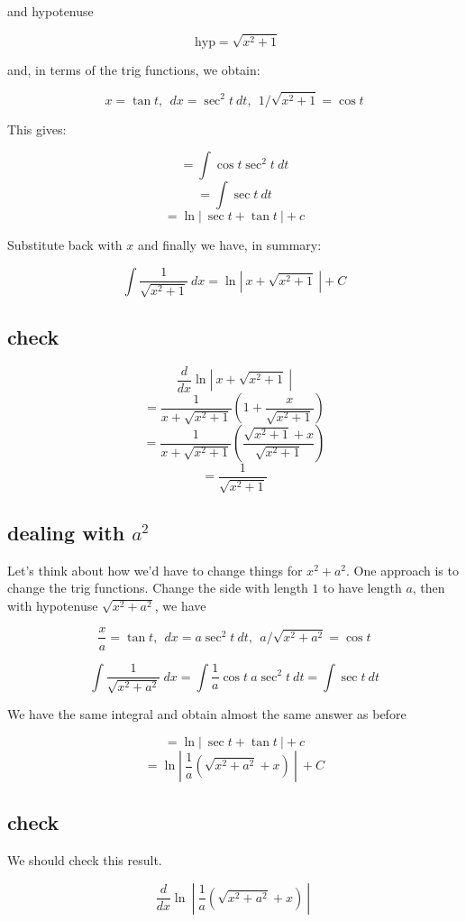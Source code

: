 \documentclass[11pt, oneside]{article}
\begin{document}
and hypotenuse

\[ \ \ \text{hyp} = \sqrt{x^2 + 1}   \]

and, in terms of the trig functions, we obtain:

\[ x = \tan t, \ \ dx = \sec^2 t  \ dt, \ \ 1/\sqrt{x^2 + 1} = \cos t \]

This gives:

\[ = \int \cos t \sec^2 t \ dt \]
\[ = \int \sec t \ dt \]
\[ = \ln | \ \sec t + \tan t \ | + c \]

Substitute back with $x$ and finally we have, in summary:

\[ \int \frac{1}{\sqrt{x^2 + 1}} \ dx = \ln | \ x + \sqrt{x^2 + 1} \  | + C \]

\subsection*{check}

\[ \frac{d}{dx} \ln | \ x + \sqrt{x^2 + 1}  \ | \]
\[ = \frac{1}{x + \sqrt{x^2 + 1} } ( 1 + \frac{x}{\sqrt{x^2 + 1}}) \]
\[ = \frac{1}{x + \sqrt{x^2 + 1} } ( \frac{\sqrt{x^2 + 1} + x }{\sqrt{x^2 + 1}} ) \]
\[ = \frac{1}{\sqrt{x^2 + 1}} \]

\subsection*{dealing with $a^2$}

Let's think about how we'd have to change things for $x^2 + a^2$.  One approach is to change the trig functions.  Change the side with length $1$ to have length $a$, then with hypotenuse $\sqrt{x^2 + a^2}$, we have

\[ \frac{x}{a} = \tan t, \ \  dx = a \sec^2 t  \ dt, \ \ a/\sqrt{x^2 + a^2} = \cos t \]

\[ \int \frac{1}{\sqrt{x^2 + a^2}} \ dx = \int \frac{1}{a} \cos t \ a \sec^2 t \ dt = \int \sec t \ dt \]

We have the same integral and obtain almost the same answer as before

\[ = \ln | \ \sec t + \tan t \ | + c \]
\[ = \ln | \ \frac{1}{a} ( \sqrt{x^2 + a^2}  + x) \ | \ + C \]

\subsection*{check}

We should check this result.

\[ \frac{d}{dx} \ln \ | \ \frac{1}{a} ( \sqrt{x^2 + a^2}  + x) \ | \    \]
\end{document}
